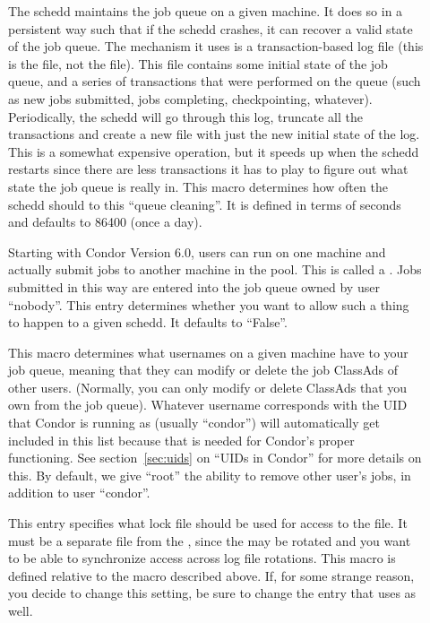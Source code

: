 \begin{description}
\item[] \label{param:QueueCleanInterval}
  The schedd maintains the job queue on a given machine.  It does so
  in a persistent way such that if the schedd crashes, it can recover
  a valid state of the job queue.  The mechanism it uses is a
  transaction-based log file (this is the  file,
  not the  file).  This file contains some initial
  state of the job queue, and a series of transactions that were
  performed on the queue (such as new jobs submitted, jobs completing,
  checkpointing, whatever).  Periodically, the schedd will go through
  this log, truncate all the transactions and create a new file with
  just the new initial state of the log.  This is a somewhat expensive
  operation, but it speeds up when the schedd restarts since there are
  less transactions it has to play to figure out what state the job
  queue is really in.  This macro determines how often the schedd
  should to this ``queue cleaning''.  It is defined in terms of
  seconds and defaults to 86400 (once a day). 
  
\item[] \label{param:AllowRemoteSubmit}
  Starting with Condor Version 6.0, users can run  on
  one machine and actually submit jobs to another machine in the
  pool.  This is called a .  Jobs submitted in
  this way are entered into the job queue owned by user ``nobody''.
  This entry determines whether you want to allow such a thing to
  happen to a given schedd.  It defaults to ``False''.
     
\item[] \label{param:QueueSuperUsers} This
  macro determines what usernames on a given machine have
   to your job queue, meaning that they can
  modify or delete the job ClassAds of other users.  (Normally, you
  can only modify or delete ClassAds that you own from the job queue).
  Whatever username corresponds with the UID that Condor is running as
  (usually ``condor'') will automatically get included in this list
  because that is needed for Condor's proper functioning.  See
  section~\ref{sec:uids} on ``UIDs in Condor'' for more details on
  this.  By default, we give ``root'' the ability to remove other
  user's jobs, in addition to user ``condor''.
      
\item[] \label{param:ScheddLock} This entry
  specifies what lock file should be used for access to the
   file.  It must be a separate file from the
  , since the  may be rotated and you
  want to be able to synchronize access across log file rotations.
  This macro is defined relative to the  macro described
  above.  If, for some strange reason, you decide to change this
  setting, be sure to change the  entry that
   uses as well.


\end{description}
